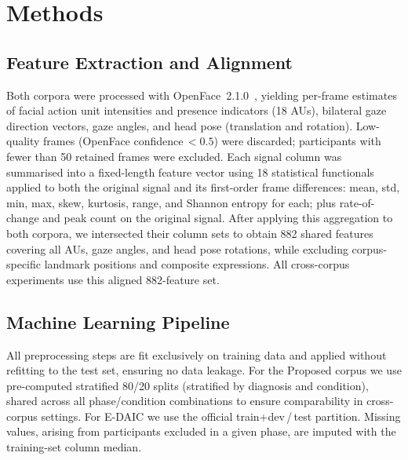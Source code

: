 \documentclass[sigconf]{acmart}
\begin{document}
\section{Methods}
\label{sec:methods}

\subsection{Feature Extraction and Alignment}
\label{sec:features}

Both corpora were processed with OpenFace~2.1.0~\cite{baltrusaitis2018openface}, yielding
per-frame estimates of facial action unit intensities and presence indicators (18 AUs),
bilateral gaze direction vectors, gaze angles, and head pose (translation and rotation).
Low-quality frames (OpenFace confidence\,$< 0.5$) were discarded; participants with fewer
than 50 retained frames were excluded.
Each signal column was summarised into a fixed-length feature vector using 18 statistical
functionals applied to both the original signal and its first-order frame differences:
mean, std, min, max, skew, kurtosis, range, and Shannon entropy for each; plus
rate-of-change and peak count on the original signal.
After applying this aggregation to both corpora, we intersected their column sets to obtain
882 shared features covering all AUs, gaze angles, and head pose rotations, while excluding
corpus-specific landmark positions and composite expressions.
All cross-corpus experiments use this aligned 882-feature set.

\subsection{Machine Learning Pipeline}
\label{sec:pipeline}

All preprocessing steps are fit exclusively on training data and applied without
refitting to the test set, ensuring no data leakage.
For the Proposed corpus we use pre-computed stratified 80/20 splits (stratified by
diagnosis and condition), shared across all phase/condition combinations to ensure
comparability in cross-corpus settings.
For E-DAIC we use the official train+dev\,/\,test partition.
Missing values, arising from participants excluded in a given phase, are imputed with the
training-set column median.
\end{document}

